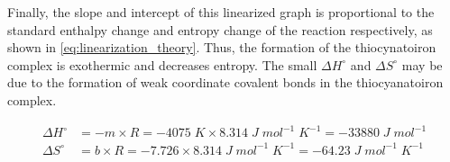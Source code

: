 Finally, the slope and intercept of this linearized graph is proportional to the standard enthalpy change and entropy change of the reaction respectively, as shown in \cref{eq:linearization_theory}. Thus, the formation of the thiocynatoiron complex is exothermic and decreases entropy. The small \(\Delta H^\circ\) and \(\Delta S^\circ\) may be due to the formation of weak coordinate covalent bonds in the thiocyanatoiron complex.

\begin{align}
    \Delta H^\circ &= - m \times R = - 4075\; K \times 8.314 \; J \; mol^{-1} \; K^{-1} = -33880 \; J \; mol^{-1} \\
    \Delta S^\circ &= b \times R = -7.726 \times 8.314 \; J \; mol^{-1} \; K^{-1} = -64.23 \; J \; mol^{-1} \; K^{-1}
\end{align}